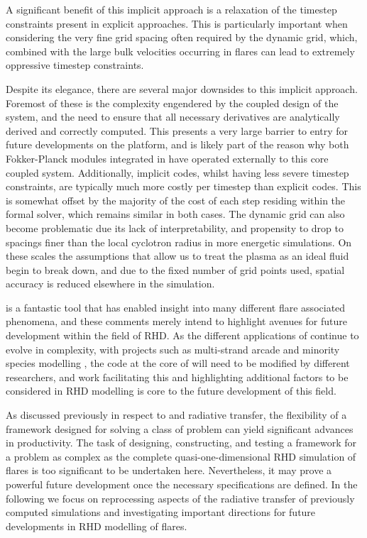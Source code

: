 A significant benefit of this implicit approach is a relaxation of the timestep constraints present in explicit approaches.
This is particularly important when considering the very fine grid spacing often required by the dynamic grid, which, combined with the large bulk velocities occurring in flares can lead to extremely oppressive timestep constraints.

Despite its elegance, there are several major downsides to this implicit approach.
Foremost of these is the complexity engendered by the coupled design of the system, and the need to ensure that all necessary derivatives are analytically derived and correctly computed.
This presents a very large barrier to entry for future developments on the platform, and is likely part of the reason why both Fokker-Planck modules integrated in \Radyn{} have operated externally to this core coupled system.
Additionally, implicit codes, whilst having less severe timestep constraints, are typically much more costly per timestep than explicit codes.
This is somewhat offset by the majority of the cost of each step residing within the formal solver, which remains similar in both cases.
The dynamic grid can also become problematic due its lack of interpretability, and propensity to drop to spacings finer than the local cyclotron radius in more energetic simulations.
On these scales the assumptions that allow us to treat the plasma as an ideal fluid begin to break down, and due to the fixed number of grid points used, spatial accuracy is reduced elsewhere in the simulation.

\Radyn{} is a fantastic tool that has enabled insight into many different flare associated phenomena, and these comments merely intend to highlight avenues for future development within the field of RHD.
As the different applications of \Radyn{} continue to evolve in complexity, with projects such as multi-strand arcade and minority species modelling \NeedRef{}, the code at the core of \Radyn{} will need to be modified by different researchers, and work facilitating this and highlighting additional factors to be considered in RHD modelling is core to the future development of this field.

As discussed previously in respect to \Lw{} and radiative transfer, the flexibility of a framework designed for solving a class of problem can yield significant advances in productivity.
The task of designing, constructing, and testing a framework for a problem as complex as the complete quasi-one-dimensional RHD simulation of flares is too significant to be undertaken here.
Nevertheless, it may prove a powerful future development once the necessary specifications are defined.
In the following we focus on reprocessing aspects of the radiative transfer of previously computed \Radyn{} simulations and investigating important directions for future developments in RHD modelling of flares.

